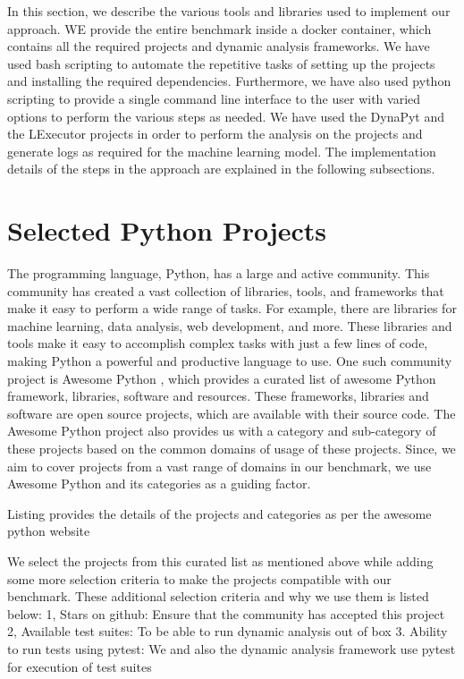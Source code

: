 In this section, we describe the various tools and libraries used to implement our approach. WE provide the entire benchmark inside a docker container, which contains all the required projects and dynamic analysis frameworks. We have used bash scripting to automate the repetitive tasks of setting up the projects and installing the required dependencies. Furthermore, we have also used python scripting to provide a single command line interface to the user with varied options to perform the various steps as needed. We have used the DynaPyt \cite{DynaPyt2022} and the LExecutor\cite{LExecutor_2023} projects in order to perform the analysis on the projects and generate logs as required for the machine learning model. The implementation details of the steps in the approach are explained in the following subsections.

\section{Selected Python Projects}
\label{impl:selection of projects}
The programming language, Python, has a large and active community. This community has created a vast collection of libraries, tools, and frameworks that make it easy to perform a wide range of tasks. For example, there are libraries for machine learning, data analysis, web development, and more. These libraries and tools make it easy to accomplish complex tasks with just a few lines of code, making Python a powerful and productive language to use. One such community project is Awesome Python \cite{awesome_python_github}, which provides a curated list of awesome Python framework, libraries, software and resources. These frameworks, libraries and software are open source projects, which are available with their source code. The Awesome Python project also provides us with a category and sub-category of these projects based on the common domains of usage of these projects. Since, we aim to cover projects from a vast range of domains in our benchmark, we use Awesome Python and its categories as a guiding factor.

Listing provides the details of the projects and categories as per the awesome python website

We select the projects from this curated list as mentioned above while adding some more selection criteria to make the projects compatible with our benchmark. These additional selection criteria and why we use them is listed below:
1, Stars on github: Ensure that the community has accepted this project
2, Available test suites: To be able to run dynamic analysis out of box
3. Ability to run tests using pytest: We and also the dynamic analysis framework use pytest for execution of test suites


